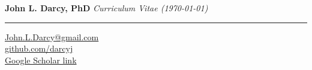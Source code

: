 \documentclass{article}
\begin{document}
{\Huge \textbf{John L. Darcy, PhD}}
\hfill
\emph{Curriculum Vitae (\today)}
\vspace{1mm}
\hrule
\vspace{2mm}

\begin{adjustwidth}{5mm}{}
  \begin{multicols}{3}
    \faEnvelope \space \href{mailto:John.L.Darcy@gmail.com}{John.L.Darcy@gmail.com}\\
    \faGithub \space \href{https://github.com/darcyj}{github.com/darcyj}\\
    \faMortarBoard \space \href{https://scholar.google.com/citations?user=z24F3PYAAAAJ}{Google Scholar link}
  \end{multicols}
\end{adjustwidth}
\end{document}
